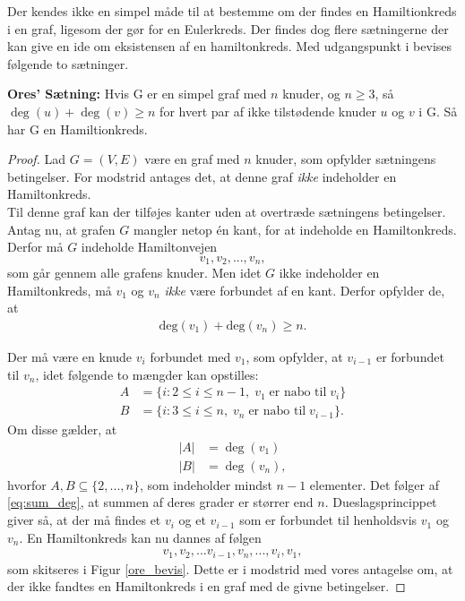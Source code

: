 Der kendes ikke en simpel måde til at bestemme om der findes en Hamiltionkreds i en graf, ligesom der gør for en Eulerkreds. 
Der findes dog flere sætningerne der kan give en ide om eksistensen af en hamiltonkreds. Med udgangspunkt i \cite{wilson_graph} bevises følgende to sætninger.

\begin{thm} \label{ores_thm}
\textbf{Ores' Sætning:} 
Hvis G er en simpel graf med $n$ knuder, og $n\geq3$, så\\ $\deg(u)+\deg(v)\geq n$ for hvert par af ikke tilstødende knuder $u$ og $v$ i G. 
Så har G en Hamiltionkreds. 
\end{thm}

\begin{proof}
Lad $G=(V,E)$ være en graf med $n$ knuder, som opfylder sætningens betingelser. For modstrid antages det, at denne graf \textit{ikke} indeholder en Hamiltonkreds. \\
Til denne graf kan der tilføjes kanter uden at overtræde sætningens betingelser. Antag nu, at grafen $G$ mangler netop én kant, for at indeholde en Hamiltonkreds. 
Derfor må $G$ indeholde Hamiltonvejen 
$$v_1, v_2,...,v_n,$$
som går gennem alle grafens knuder. 
Men idet $G$ ikke indeholder en Hamiltonkreds, må $v_1$ og $v_n$ \textit{ikke} være forbundet af en kant.
Derfor opfylder de, at
\begin{align} \label{eq:sum_deg}
\textrm{deg}(v_1)+\textrm{deg}(v_n)\geq n.
\end{align}



Der må være en knude $v_i$ forbundet med $v_1$, som opfylder, at $v_{i-1}$ er forbundet til $v_n$, idet følgende to mængder kan opstilles:
\begin{align*}
A &= \lbrace i: 2 \leq i \leq n-1, \; v_1 \; \textrm{er nabo til} \; v_i \rbrace \\
B &= \lbrace i: 3 \leq i \leq n, \; v_n \; \textrm{er nabo til} \; v_{i-1} \rbrace.
\end{align*}
Om disse gælder, at
\begin{align*}
|A| &= \deg(v_1) \\
|B| &= \deg(v_n),
\end{align*}
hvorfor $A,B \subseteq \lbrace 2,...,n \rbrace$, som indeholder mindst $n-1$ elementer. Det følger af \eqref{eq:sum_deg}, at summen af deres grader er størrer end $n$. Dueslagsprincippet giver så, at der må findes et $v_i$ og et $v_{i-1}$ som er forbundet til henholdsvis $v_1$ og $v_n$. En Hamiltonkreds kan nu dannes af følgen
\begin{align*}
v_1, v_2,...v_{i-1},v_n,...,v_i,v_1,
\end{align*}
som skitseres i Figur \ref{ore_bevis}. Dette er i modstrid med vores antagelse om, at der ikke fandtes en Hamiltonkreds i en graf med de givne betingelser.


\end{proof}

